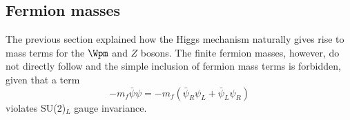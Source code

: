 



\subsection{Fermion masses}
\label{subsec:fermion-masses}

The previous section explained how the Higgs mechanism naturally gives rise to mass terms for the $\Wpm$ and $Z$ bosons. The finite fermion masses, however, do not directly follow and the simple inclusion of fermion mass terms is forbidden, given that a term
\begin{equation}
  -m_f \bar{\psi} \psi = -m_f \left( \bar{\psi}_R\psi_L + \bar{\psi}_L\psi_R \right)
  \label{eq:fermionmassterm}
\end{equation}
violates SU(2)$_L$ gauge invariance.

